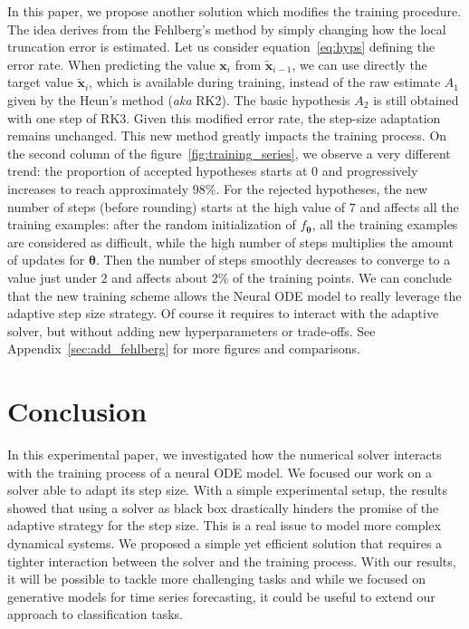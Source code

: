 \documentclass{article}
\newcommand{\x}{\ensuremath{\mathbf{x}}} %
\newcommand{\tx}{\ensuremath{\tilde{\mathbf{x}}}} %
\newcommand{\params}{\ensuremath{\boldsymbol{\theta}}}
\newcommand{\nnet}{\ensuremath{f_{\params}}}
\begin{document}
In this paper, we propose another solution which modifies the training
procedure. The idea derives from the Fehlberg's method by simply
changing how the local truncation error is estimated. Let us consider equation~\ref{eq:hyps} defining the error rate.
When predicting the value $\x_i$ from $\tx_{i-1}$, we can use directly the target value $\tx_i$, which is available during training,  instead of the raw estimate $A_1$ given by the Heun's method (\textit{aka} RK2). The basic
hypothesis $A_2$ is still obtained with one step of RK3.
Given this modified error rate, the step-size adaptation remains
unchanged. This new method greatly impacts the training process. On
the second column of the figure~\ref{fig:training_series}, we observe
a very different trend: the proportion of accepted hypotheses starts at 0 and 
progressively increases to reach approximately 98\%.
For the rejected hypotheses, the new number of steps (before rounding)
starts at the high value of $7$ and affects all the training examples:
after the random initialization of $\nnet$, all the training examples
are considered as difficult, while the high number of steps multiplies
the amount of updates for $\params$.  Then the number of steps
smoothly decreases to converge to a value just under $2$ and affects
about 2\% of the training points. We can conclude that the new
training scheme allows the Neural ODE model to really leverage the
adaptive step size strategy. Of course it requires to interact with
the adaptive solver, but without adding new hyperparameters or
trade-offs. See Appendix~\ref{sec:add_fehlberg} for more figures and
comparisons.


\section{Conclusion}
In this experimental paper, we investigated how the numerical solver
interacts with the training process of a neural ODE model. We focused
our work on a solver able to adapt its step size.  With a simple
experimental setup, the results showed that using a solver as black
box drastically hinders the promise of the adaptive strategy for the
step size. This is a real issue to model more complex dynamical
systems. We proposed a simple yet efficient solution that requires a
tighter interaction between the solver and the training process. With
our results, it will be possible to tackle more challenging tasks and
while we focused on generative models for time series forecasting, it
could be useful to extend our approach to classification tasks.
\end{document}
